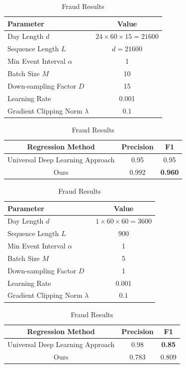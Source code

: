 \documentclass{article}
\begin{document}
\begin{table}
\parbox{.45\linewidth}{
\centering
\caption{Bowshock Experimental Parameters}
\label{tbl:bs_param}
\begin{tabular}{|l|c|}
\hline Parameter & Value \\
\hline 
Day Length $d$ & $24\times60\times15 = 21600$ \\
Sequence Length $L$ & $d = 21600$ \\
Min Event Interval $\alpha$ & 1 \\
Batch Size $M$ & 10 \\
Down-sampling Factor $D$ & 15 \\
Learning Rate & 0.001 \\
Gradient Clipping Norm $\lambda$ & $0.1$ \\
\hline
\end{tabular}
}
\hfill
\parbox{.45\linewidth}{
\centering
\caption{Bowshock Results}
\label{tbl:bs_result}
\begin{tabular}{|ccc|}
\hline
Regression Method & Precision      & F1             \\ \hline
Universal Deep Learning Approach \citep{azib2023}       & 0.95           & 0.95 \\
Ours              & 0.992 & \textbf{0.960}           \\ \hline
\end{tabular}
}
\hfill
\parbox{.45\linewidth}{
\centering
\caption{Fraud Experimental Parameters}
\label{tbl:fr_param}
\begin{tabular}{|l|c|}
\hline Parameter & Value \\
\hline 
Day Length $d$ & $1\times60\times60 = 3600$ \\
Sequence Length $L$ & $900$ \\
Min Event Interval $\alpha$ & 1 \\
Batch Size $M$ & 5 \\
Down-sampling Factor $D$ & 1 \\
Learning Rate & 0.001 \\
Gradient Clipping Norm $\lambda$ & $0.1$ \\
\hline
\end{tabular}
}
\hfill
\parbox{.45\linewidth}{
\centering
\caption{Fraud Results}
\label{tbl:fr_result}
\begin{tabular}{|ccc|}
\hline
Regression Method & Precision      & F1             \\ \hline
Universal Deep Learning Approach \citep{azib2023}       & 0.98           & \textbf{0.85} \\
Ours              & 0.783 & 0.809           \\ \hline
\end{tabular}
}
\hfill
\end{table}
\end{document}
